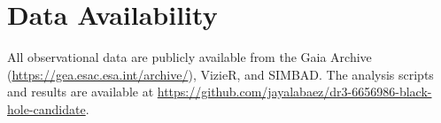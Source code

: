 \documentclass[usenatbib,fleqn]{mnras}
\begin{document}
\section*{Data Availability}

All observational data are publicly available from the Gaia Archive
(\url{https://gea.esac.esa.int/archive/}), VizieR, and SIMBAD.
The analysis scripts and results are available at
\url{https://github.com/jayalabaez/dr3-6656986-black-hole-candidate}.




\end{document}

